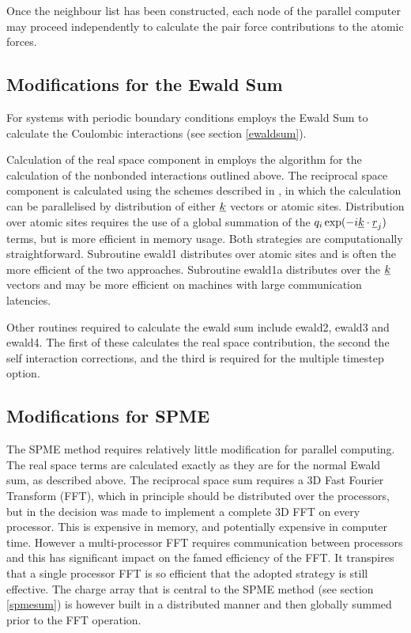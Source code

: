 Once the neighbour list has been constructed, each node of the
parallel computer may proceed independently to calculate the pair
force contributions to the atomic forces. 

\subsection{Modifications for the Ewald Sum}

For systems with periodic boundary conditions \D{} employs the Ewald Sum
to calculate the Coulombic interactions (see section \ref{ewaldsum}).

Calculation of the real space component in \D{} employs the algorithm
for the calculation of the nonbonded interactions outlined above. The
reciprocal space component is calculated using the schemes described
in \cite{smith-92b}, in which the calculation can be
parallelised by
distribution of either $\mbox{$\underline{k}$}$ vectors or atomic sites. Distribution
over atomic sites requires the use of a global summation of the
$q_{i}\exp(-i\mbox{$\underline{k}$}\cdot\mbox{$\underline{r}$}_{j})$ terms, but is more efficient in
memory usage. Both strategies are computationally straightforward.
Subroutine {\sc ewald1} distributes over atomic sites and is often the
more efficient of the two approaches. Subroutine {\sc ewald1a}
distributes over the $\mbox{$\underline{k}$}$ vectors and may be more efficient on
machines with large communication latencies.

Other routines required to calculate the ewald sum include {\sc
ewald2}, {\sc ewald3} and {\sc ewald4}. The first of these calculates
the real space contribution, the second the self interaction
corrections, and the third is required for the multiple timestep
option.

\subsection{Modifications for SPME}

The SPME method requires
relatively little modification for parallel computing. The real space
terms are calculated exactly as they are for the normal Ewald sum, as
described above. The reciprocal space sum requires a 3D Fast Fourier
Transform (FFT), which in principle should be distributed over the
processors, but in \D{} the decision was made to implement a complete 3D
FFT on every processor. This is expensive in memory, and potentially
expensive in computer time. However a multi-processor FFT requires
communication between processors and this has significant impact on
the famed efficiency of the FFT. It transpires that a single processor
FFT is so efficient that the adopted strategy is still effective. The
charge array that is central to the SPME method (see section
\ref{spmesum}) is however built in a distributed manner and then
globally summed prior to the FFT operation.

